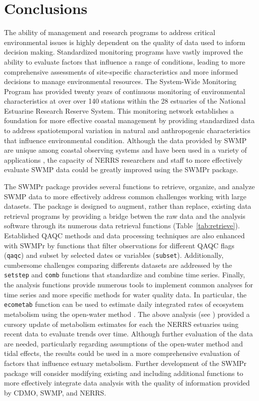 \section{Conclusions}

The ability of management and research programs to address critical environmental issues is highly dependent on the quality of data used to inform decision making.  Standardized monitoring programs have vastly improved the ability to evaluate factors that influence a range of conditions, leading to more comprehensive assessments of site-specific characteristics and more informed decisions to manage environmental resources.  The System-Wide Monitoring Program has provided twenty years of continuous monitoring of environmental characteristics at over over 140 stations within the 28 estuaries of the National Estuarine Research Reserve System.  This monitoring network establishes a foundation  for more effective coastal management by providing standardized data to address spatiotemporal variation in natural and anthropogenic characteristics that influence environmental condition.  Although the data provided by SWMP are unique among coastal observing systems and have been used in a variety of applications \cite{Bulthius95,Caffrey03,Sanger02,Wenner04,Dix08}, the capacity of NERRS researchers and staff to more effectively evaluate SWMP data could be greatly improved using the SWMPr package.

The SWMPr package provides several functions to retrieve, organize, and analyze SWMP data to more effectively address common challenges working with large datasets.  The package is designed to augment, rather than replace, existing data retrieval programs by providing a bridge betwen the raw data and the analysis software through its numerous data retrieval functions (Table~\ref{tab:retrieve}).  Established QAQC methods and data processing techniques are also enhanced with SWMPr by functions that filter observations for different QAQC flags (\texttt{qaqc}) and subset by selected dates or variables (\texttt{subset}).  Additionally, cumbersome challenges comparing differents datasets are addressed by the \texttt{setstep} and \texttt{comb} functions that standardize and combine time series.  Finally, the analysis functions provide numerous tools to implement common analyses for time series and more specific methods for water quality data.  In particular, the \texttt{ecometab} function can be used to estimate daily integrated rates of ecosystem metabolism using the open-water method \cite{Odum56,Caffrey14}.  The above analysis (see ) provided a cursory update of metabolism estimates for each the NERRS estuaries using recent data to evaluate trends over time.  Although further evaluation of the data are needed, particularly regarding assumptions of the open-water method and tidal effects, the results could be used in a more comprehensive evaluation of factors that influence estuary metabolism. Further development of the SWMPr package will consider modifying existing and including additional functions to more effectively integrate data analysis with the quality of information provided by CDMO, SWMP, and NERRS. 

